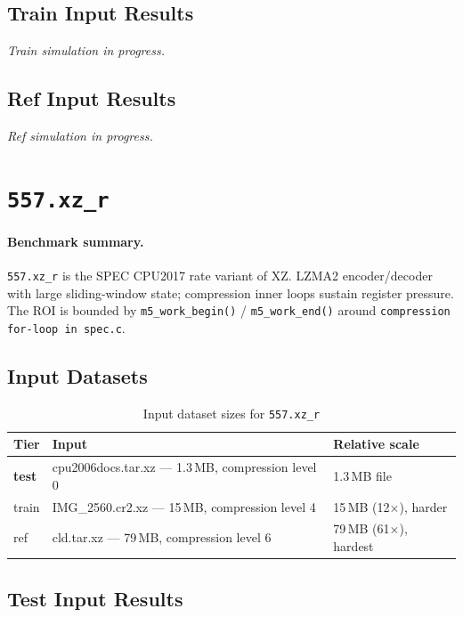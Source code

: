 \documentclass[11pt,a4paper]{article}
\begin{document}
\subsection{Train Input Results}

\textit{Train simulation in progress.}


\subsection{Ref Input Results}
\textit{Ref simulation in progress.}



\section{\texttt{557.xz\_r}}
\label{sec:xz}

\paragraph{Benchmark summary.}
\texttt{557.xz\_r} is the SPEC CPU2017 rate variant of XZ.
LZMA2 encoder/decoder with large sliding-window state; compression inner loops sustain register pressure.
The ROI is bounded by \texttt{m5\_work\_begin()} / \texttt{m5\_work\_end()}
around \texttt{compression for-loop in spec.c}.

\subsection{Input Datasets}

\begin{table}[H]
\centering
\caption{Input dataset sizes for \texttt{557.xz\_r}}
\label{tab:xz_inputs}
\small
\begin{tabular}{lp{8cm}l}
\toprule
\textbf{Tier} & \textbf{Input} & \textbf{Relative scale} \\
\midrule
\textbf{test} & cpu2006docs.tar.xz --- 1.3\,MB, compression level 0 & 1.3\,MB file \\
train & IMG\_2560.cr2.xz --- 15\,MB, compression level 4 & 15\,MB (12$\times$), harder \\
ref & cld.tar.xz --- 79\,MB, compression level 6 & 79\,MB (61$\times$), hardest \\
\bottomrule
\end{tabular}
\end{table}

\subsection{Test Input Results}
\end{document}
